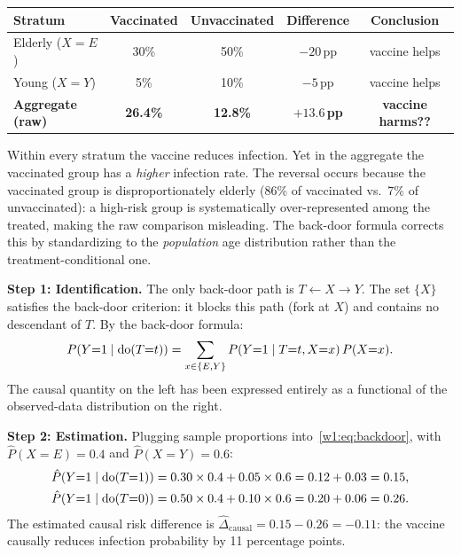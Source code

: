 \documentclass[master.tex]{subfiles}
\begin{document}
\begin{center}
\renewcommand{\arraystretch}{1.3}
\begin{tabular}{@{}lccc c@{}}
\toprule
\textbf{Stratum} & \textbf{Vaccinated} & \textbf{Unvaccinated} & \textbf{Difference} & \textbf{Conclusion} \\
\midrule
Elderly ($X=E$) & 30\% & 50\% & $-20$\,pp & vaccine helps \\
Young   ($X=Y$) &  5\% & 10\% & $-5$\,pp  & vaccine helps \\
\midrule
\textbf{Aggregate (raw)} & \textbf{26.4\%} & \textbf{12.8\%} & $\mathbf{+13.6}$\,\textbf{pp} & \textbf{vaccine harms??} \\
\bottomrule
\end{tabular}
\end{center}

\noindent
Within every stratum the vaccine reduces infection.  Yet in the aggregate
the vaccinated group has a \emph{higher} infection rate.  The reversal
occurs because the vaccinated group is disproportionately elderly (86\% of
vaccinated vs.\ 7\% of unvaccinated): a high-risk group is systematically
over-represented among the treated, making the raw comparison misleading.
The back-door formula corrects this by standardizing to the \emph{population}
age distribution rather than the treatment-conditional one.

\medskip
\noindent\textbf{Step 1: Identification.}
The only back-door path is $T \leftarrow X \to Y$.  The set $\{X\}$
satisfies the back-door criterion: it blocks this path (fork at $X$) and
contains no descendant of $T$.  By the back-door formula:
\begin{equation}
  P\!\left(Y{=}1 \mid \mathrm{do}(T{=}t)\right)
  = \sum_{x \in \{E,Y\}}
    P(Y{=}1 \mid T{=}t, X{=}x)\,P(X{=}x).
  \label{w1:eq:backdoor}
\end{equation}
The causal quantity on the left has been expressed entirely as a functional
of the observed-data distribution on the right.

\medskip
\noindent\textbf{Step 2: Estimation.}
Plugging sample proportions into~\eqref{w1:eq:backdoor}, with
$\hat{P}(X{=}E) = 0.4$ and $\hat{P}(X{=}Y) = 0.6$:
\begin{align*}
  \hat{P}(Y{=}1 \mid \mathrm{do}(T{=}1))
    &= 0.30 \times 0.4 + 0.05 \times 0.6 = 0.12 + 0.03 = 0.15, \\
  \hat{P}(Y{=}1 \mid \mathrm{do}(T{=}0))
    &= 0.50 \times 0.4 + 0.10 \times 0.6 = 0.20 + 0.06 = 0.26.
\end{align*}
The estimated causal risk difference is
$\hat{\Delta}_{\mathrm{causal}} = 0.15 - 0.26 = -0.11$:
the vaccine causally reduces infection probability by 11 percentage points.
\end{document}
